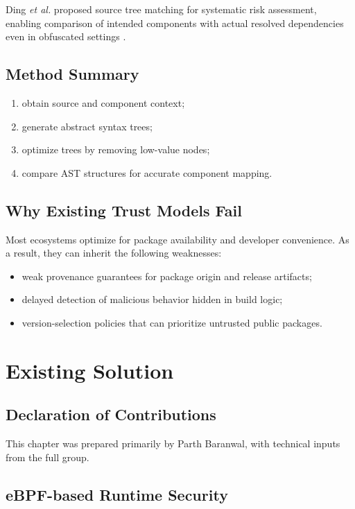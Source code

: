 Ding \textit{et al.} proposed source tree matching for systematic risk assessment,
enabling comparison of intended components with actual resolved dependencies even in
obfuscated settings \citep{ding2024dependency}.

\section{Method Summary}

\begin{enumerate}
\item obtain source and component context;
\item generate abstract syntax trees;
\item optimize trees by removing low-value nodes;
\item compare AST structures for accurate component mapping.
\end{enumerate}

\section{Why Existing Trust Models Fail}

Most ecosystems optimize for package availability and developer convenience.
As a result, they can inherit the following weaknesses:

\begin{itemize}
\item weak provenance guarantees for package origin and release artifacts;
\item delayed detection of malicious behavior hidden in build logic;
\item version-selection policies that can prioritize untrusted public packages.
\end{itemize}

\chapter{Existing Solution}
\label{ch:existing-solution}

\section*{Declaration of Contributions}
This chapter was prepared primarily by Parth Baranwal,
with technical inputs from the full group.

\section{eBPF-based Runtime Security}

